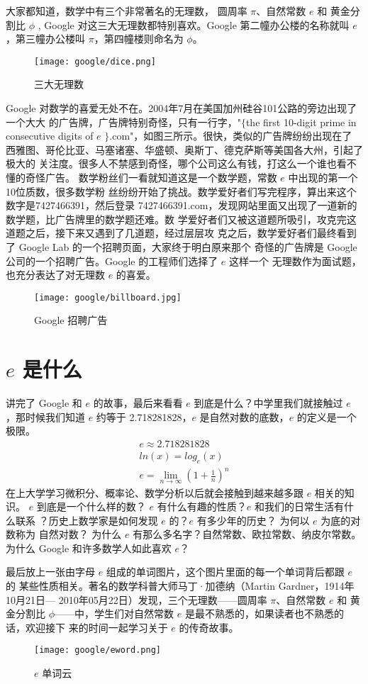 大家都知道，数学中有三个非常著名的无理数， 圆周率 $\pi$、自然常数 $e$ 和 黄金分
割比 $\phi$ , Google 对这三大无理数都特别喜欢。Google 第二幢办公楼的名称就叫
$e$，第三幢办公楼叫 $\pi$，第四幢楼则命名为 $\phi$。
\begin{figure}[htbp]
\centering
\texttt{[image: google/dice.png]}
\caption{三大无理数}
\centering
\end{figure}

Google 对数学的喜爱无处不在。2004年7月在美国加州硅谷101公路的旁边出现了一个大大
的广告牌，广告牌特别奇怪，只有一行字，"$\{$the first 10-digit prime in
consecutive digits of $e$ $\}$.com"，如图三所示。很快，类似的广告牌纷纷出现在了
西雅图、哥伦比亚、马塞诸塞、华盛顿、奥斯丁、德克萨斯等美国各大州，引起了极大的
关注度。很多人不禁感到奇怪，哪个公司这么有钱，打这么一个谁也看不懂的奇怪广告。
数学粉丝们一看就知道这是一个数学题，常数 $e$ 中出现的第一个10位质数，很多数学粉
丝纷纷开始了挑战。数学爱好者们写完程序，算出来这个数字是7427466391，然后登录
7427466391.com，发现网站里面又出现了一道新的数学题，比广告牌里的数学题还难。数
学爱好者们又被这道题所吸引，攻克完这道题之后，接下来又遇到了几道题，经过层层攻
克之后，数学爱好者们最终看到了 Google Lab 的一个招聘页面，大家终于明白原来那个
奇怪的广告牌是 Google 公司的一个招聘广告。Google 的工程师们选择了 $e$ 这样一个
无理数作为面试题，也充分表达了对无理数 $e$ 的喜爱。
\begin{figure}[htbp]
\centering
\texttt{[image: google/billboard.jpg]}
\caption{Google 招聘广告}
\centering
\end{figure}

\section{$e$ 是什么}
讲完了 Google 和 $e$ 的故事，最后来看看 $e$ 到底是什么？中学里我们就接触过 $e$
，那时候我们知道 $e$ 约等于 2.718281828，$e$ 是自然对数的底数，$e$ 的定义是一个
极限。
\begin{equation}
\nonumber
\begin{split}
e \approx 2.718281828 \\
ln(x) = log_{e}(x) \\
e = \lim_{n \to \infty}(1+\frac{1}{n})^n
\end{split}
\end{equation}
在上大学学习微积分、概率论、数学分析以后就会接触到越来越多跟 $e$ 相关的知识。
$e$ 到底是一个什么样的数？ $e$ 有什么有趣的性质？$e$ 和我们的日常生活有什么联系
？历史上数学家是如何发现 $e$ 的？$e$ 有多少年的历史？ 为何以 $e$ 为底的对数称为
自然对数？ 为什么 $e$ 有那么多名字？自然常数、欧拉常数、纳皮尔常数。为什么
Google 和许多数学人如此喜欢 $e$？

最后放上一张由字母 $e$ 组成的单词图片，这个图片里面的每一个单词背后都跟 $e$ 的
某些性质相关。著名的数学科普大师马丁·加德纳（Martin Gardner，1914年10月21日—
2010年05月22日）发现，三个无理数——圆周率 $\pi$、自然常数 $e$ 和 黄金分割比
$\phi$——中，学生们对自然常数 $e$ 是最不熟悉的，如果读者也不熟悉的话，欢迎接下
来的时间一起学习关于 $e$ 的传奇故事。
\begin{figure}[htbp]
\centering
\texttt{[image: google/eword.png]}
\caption{$e$ 单词云}
\centering
\end{figure}


